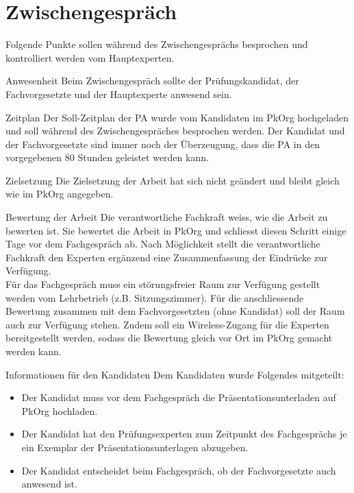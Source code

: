 \section{Zwischengespräch}
Folgende Punkte sollen während des Zwischengesprächs besprochen und kontrolliert werden vom Hauptexperten.

\begin{taskitemwithoutcomment}{Anwesenheit}
Beim Zwischengespräch sollte der Prüfungskandidat, der Fachvorgesetzte und der Hauptexperte anwesend sein.
\end{taskitemwithoutcomment}

\begin{taskitem}{Zeitplan}
Der Soll-Zeitplan der PA wurde vom Kandidaten im PkOrg hochgeladen und soll während des Zwischengespräches besprochen werden.
Der Kandidat und der Fachvorgesetzte sind immer noch der Überzeugung, dass die PA in den vorgegebenen 80 Stunden
geleistet werden kann.
\end{taskitem}

\begin{taskitem}{Zielsetzung}
Die Zielsetzung der Arbeit hat sich nicht geändert und bleibt gleich wie im PkOrg angegeben.
\end{taskitem}

\begin{taskitemwithoutcomment}{Bewertung der Arbeit}
Die verantwortliche Fachkraft weiss, wie die Arbeit zu bewerten ist.
Sie bewertet die Arbeit in PkOrg und schliesst diesen Schritt einige Tage vor dem
Fachgespräch ab. Nach Möglichkeit stellt die verantwortliche Fachkraft den
Experten ergänzend eine Zusammenfassung der Eindrücke zur Verfügung.\\
Für das Fachgespräch muss ein störungsfreier Raum zur Verfügung gestellt werden vom Lehrbetrieb (z.B. Sitzungszimmer).
Für die anschliessende Bewertung zusammen mit dem Fachvorgesetzten (ohne Kandidat) soll der Raum auch zur Verfügung stehen.
Zudem soll ein Wireless-Zugang für die Experten bereitgestellt werden, sodass die Bewertung gleich vor Ort im PkOrg gemacht
werden kann.
\end{taskitemwithoutcomment}

\begin{taskitemwithoutcomment}{Informationen für den Kandidaten}
Dem Kandidaten wurde Folgendes mitgeteilt:
\begin{itemize}
    \item Der Kandidat muss vor dem Fachgespräch die Präsentationsunterladen auf PkOrg hochladen.
    \item Der Kandidat hat den Prüfungsexperten zum Zeitpunkt des Fachgesprächs je ein Exemplar der Präsentationsunterlagen abzugeben.
    \item Der Kandidat entscheidet beim Fachgespräch, ob der Fachvorgesetzte auch anwesend ist.
\end{itemize}
\end{taskitemwithoutcomment}

